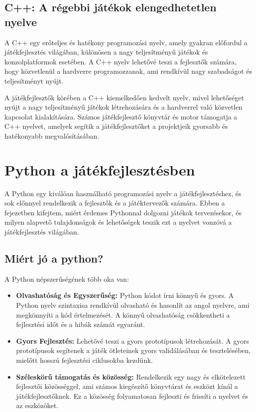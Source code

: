 \subsection{C++: A régebbi játékok elengedhetetlen nyelve}

\indent \indent A C++ \cite{cpp-doc, cpp} egy erőteljes és hatékony programozási nyelv, amely gyakran előfordul a játékfejlesztés világában, különösen a nagy teljesítményű játékok és konzolplatformok esetében. A C++ nyelv lehetővé teszi a fejlesztők számára, hogy közvetlenül a hardverre programozzanak, ami rendkívül nagy szabadságot és teljesítményt nyújt.

A játékfejlesztők körében a C++ kiemelkedően kedvelt nyelv, mivel lehetőséget nyújt a nagy teljesítményű játékok létrehozására és a hardverrel való közvetlen kapcsolat kialakítására. Számos játékfejlesztő könyvtár és motor támogatja a C++ nyelvet, amelyek segítik a játékfejlesztőket a projektjeik gyorsabb és hatékonyabb megvalósításában.


\section{Python a játékfejlesztésben}

\indent \indent A Python \cite{python} egy kiválóan használható programozási nyelv a játékfejlesztéshez, és sok előnnyel rendelkezik a fejlesztők és a játéktervezők számára. Ebben a fejezetben kifejtem, miért érdemes Pythonnal dolgozni játékok tervezésekor, és milyen alapvető tulajdonságok és lehetőségek teszik ezt a nyelvet vonzóvá a játékfejlesztés világában.

\subsection{Miért jó a python?}
A Python népszerűségének több oka van: \cite{why-is-python}

\begin{itemize}
\item    \textbf{Olvashatóság és Egyszerűség:}
    Python kódot írni könnyű és gyors. A Python nyelv szintaxisa rendkívül olvasható és hasonlít az angol nyelvre, ami megkönnyíti a kód értelmezését. A könnyű olvashatóság csökkentheti a fejlesztési időt és a hibák számát egyaránt. 
    
\item    \textbf{Gyors Fejlesztés:}
    Lehetővé teszi a gyors prototípusok létrehozását. A gyors prototípusok segítenek a játék ötleteinek gyors validálásában és tesztelésében, mielőtt hosszú fejlesztési ciklusokba kezdünk.
    
\item    \textbf{Széleskörű támogatás és közösség:}
    Rendelkezik egy nagy és elkötelezett fejlesztői közösséggel, ami számos kiegészítő könyvtárat és eszközt kínál a játékfejlesztőknek. Ez a közösség folyamatosan fejleszti és frissíti a nyelvet és az eszközöket.
\end{itemize}


